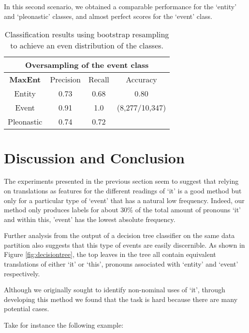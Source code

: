 \documentclass[10pt, a4paper]{article} \usepackage{lrec} \usepackage{multibib}
\begin{document}
In this second scenario, we obtained a comparable performance for the `entity' and `pleonastic' classes, and almost perfect scores for the `event' class. 

\begin{center} \begin{table}[h!] \begin{tabular}{cccc}
\multicolumn{4}{c}{\textbf{Oversampling of the event class}}\\ 
\toprule
\textbf{MaxEnt}& Precision & Recall & Accuracy \\ 
\midrule Entity & 0.73 &0.68& 
  0.80 \\ Event &0.91 & 1.0 & (8,277/10,347) \\ 
  Pleonastic &  0.74 & 0.72 & \\
\bottomrule 
\end{tabular} 
\caption{Classification results using bootstrap
resampling to achieve an even distribution of the classes.}\label{tab:maxentoversampling}
\end{table}
\end{center}


\section{Discussion and Conclusion}

The experiments presented in the previous section seem to suggest that relying on translations as features for the different readings of `it' is a good method but only for a particular type of `event' that has a natural low frequency. Indeed, our method only produces labels for about 30\% of the total amount of pronouns `it' and within this, 'event' has the lowest absolute frequency. 

Further analysis from the output of a decision tree classifier on the same data partition also suggests that this type of events are easily discernible. As shown in Figure \ref{fig:decisiontree}, the top leaves in the tree all contain equivalent translations of either `it' or `this', pronouns associated with `entity' and `event' respectively. 

Although we originally sought to identify non-nominal uses of `it', through developing this method we found that the task is hard because there are many potential
cases. 

Take for instance the following example:

\vspace{1em}
\end{document}
